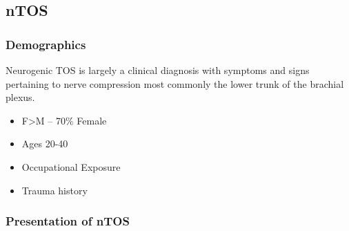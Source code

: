 \documentclass[
]{book}
\begin{document}
\hypertarget{ntos}{%
\subsection{nTOS}\label{ntos}}

\hypertarget{demographics-1}{%
\subsubsection{Demographics}\label{demographics-1}}

Neurogenic TOS is largely a clinical diagnosis with symptoms and signs
pertaining to nerve compression most commonly the lower trunk of the
brachial plexus.~

\begin{itemize}
\item
  F\textgreater M -- 70\% Female
\item
  Ages 20-40
\item
  Occupational Exposure
\item
  Trauma history
\end{itemize}

\hypertarget{presentation-of-ntos}{%
\subsubsection{Presentation of nTOS}\label{presentation-of-ntos}}
\end{document}
